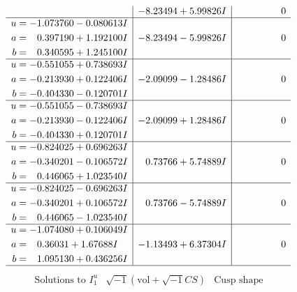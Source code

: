 \documentclass[1p]{elsarticle_modified}
\theoremstyle{definition}
\newcommand{\I}{\sqrt{-1}}
\begin{document}
$$\begin{array}{c|c|c}
 & -8.23494 + 5.99826 I & \phantom{-0.000000 } 0 \\ \hline\begin{aligned}
u &= -1.073760 - 0.080613 I \\
a &= \phantom{-}0.397190 + 1.192100 I \\
b &= \phantom{-}0.340595 + 1.245100 I\end{aligned}
 & -8.23494 - 5.99826 I & \phantom{-0.000000 } 0 \\ \hline\begin{aligned}
u &= -0.551055 + 0.738693 I \\
a &= -0.213930 + 0.122406 I \\
b &= -0.404330 - 0.120701 I\end{aligned}
 & -2.09099 - 1.28486 I & \phantom{-0.000000 } 0 \\ \hline\begin{aligned}
u &= -0.551055 - 0.738693 I \\
a &= -0.213930 - 0.122406 I \\
b &= -0.404330 + 0.120701 I\end{aligned}
 & -2.09099 + 1.28486 I & \phantom{-0.000000 } 0 \\ \hline\begin{aligned}
u &= -0.824025 + 0.696263 I \\
a &= -0.340201 - 0.106572 I \\
b &= \phantom{-}0.446065 + 1.023540 I\end{aligned}
 & \phantom{-}0.73766 + 5.74889 I & \phantom{-0.000000 } 0 \\ \hline\begin{aligned}
u &= -0.824025 - 0.696263 I \\
a &= -0.340201 + 0.106572 I \\
b &= \phantom{-}0.446065 - 1.023540 I\end{aligned}
 & \phantom{-}0.73766 - 5.74889 I & \phantom{-0.000000 } 0 \\ \hline\begin{aligned}
u &= -1.074080 + 0.106049 I \\
a &= \phantom{-}0.36031 + 1.67688 I \\
b &= \phantom{-}1.095130 + 0.436256 I\end{aligned}
 & -1.13493 + 6.37304 I & \phantom{-0.000000 } 0\\
 \hline 
 \end{array}$$\newpage$$\begin{array}{c|c|c}  
\text{Solutions to }I^u_{1}& \I (\text{vol} + \sqrt{-1}CS) & \text{Cusp shape}\\

\end{array}$$
\end{document}
